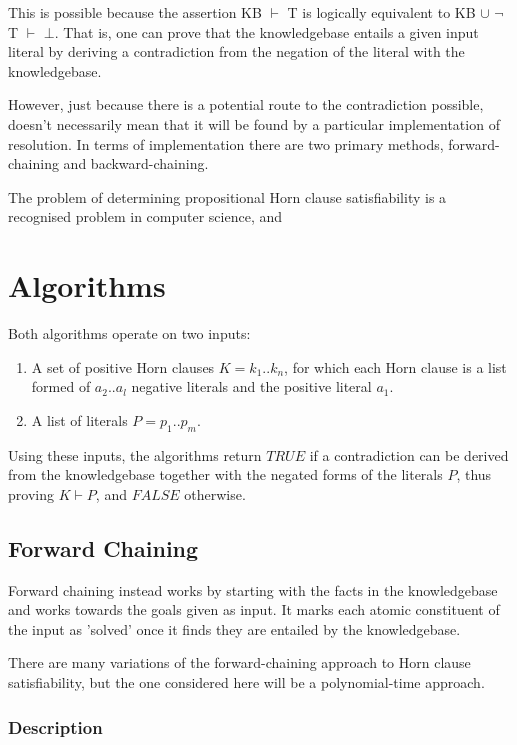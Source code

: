 \documentclass{article}
\begin{document}
This is possible because the assertion KB $\vdash$ T is logically equivalent to
KB $\cup$ $\neg$T $\vdash$ $\bot$. That is, one can prove that the knowledgebase
entails a given input literal by deriving a contradiction from the negation of
the literal with the knowledgebase.

However, just because there is a potential route to the contradiction possible,
doesn't necessarily mean that it will be found by a particular implementation of
resolution. In terms of implementation there are two primary methods, 
forward-chaining and backward-chaining.

The problem of determining propositional Horn clause satisfiability is a
recognised problem in computer science, and 

\section{Algorithms}

Both algorithms operate on two inputs:

\begin{enumerate}
  \item A set of positive Horn clauses $K = k_1 .. k_n$, for which each Horn
  clause is a list formed of $a_2 .. a_l$ negative literals and the positive 
  literal $a_1$. 
  \item A list of literals $P = p_1 .. p_m$.
\end{enumerate}

Using these inputs, the algorithms return $TRUE$ if a contradiction can be derived
from the knowledgebase together with the negated forms of the literals $P$, thus proving
$K \vdash P$, and $FALSE$ otherwise.

\subsection{Forward Chaining}

Forward chaining instead works by starting with the facts in the knowledgebase
and works towards the goals given as input. It marks each atomic constituent of
the input as 'solved' once it finds they are entailed by the knowledgebase.

There are many variations of the forward-chaining approach to Horn clause
satisfiability, but the one considered here will be a polynomial-time approach.

\subsubsection{Description}
\end{document}
